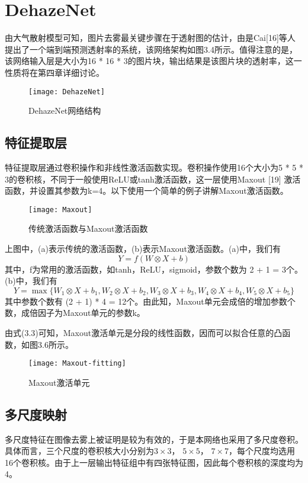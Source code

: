 \documentclass[a4paper, 12pt]{report}
\begin{document}
\section{DehazeNet\quad}
由大气散射模型可知，图片去雾最关键步骤在于透射图的估计，由是Cai[16]等人提出了一个端到端预测透射率的系统，该网络架构如图3.4所示。值得注意的是，该网络输入层是大小为16 * 16 * 3的图片块，输出结果是该图片块的透射率，这一性质将在第四章详细讨论。
\begin{figure}[h]
\centering
\texttt{[image: DehazeNet]}
\caption{DehazeNet网络结构}
\end{figure}

\subsection{特征提取层\quad}
特征提取层通过卷积操作和非线性激活函数实现。卷积操作使用16个大小为5 * 5 * 3的卷积核，不同于一般使用ReLU或tanh激活函数，这一层使用Maxout [19] 激活函数，并设置其参数为k=4。以下使用一个简单的例子讲解Maxout激活函数。
\begin{figure}[H]
\centering
\texttt{[image: Maxout]}
\caption{传统激活函数与Maxout激活函数}
\end{figure}
上图中，(a)表示传统的激活函数，(b)表示Maxout激活函数。(a)中，我们有$$Y = f(W \otimes X + b)$$
其中，f为常用的激活函数，如tanh，ReLU，sigmoid，参数个数为 2 + 1 = 3个。(b)中，我们有
\begin{equation}
Y = \max\{W_1 \otimes X + b_1, W_2 \otimes X + b_2, W_3 \otimes X + b_3, W_4 \otimes X + b_4, W_5 \otimes X + b_5\}
\end{equation}
其中参数个数有 (2 + 1) * 4 = 12个。由此知，Maxout单元会成倍的增加参数个数，成倍因子为Maxout单元的参数k。

由式(3.3)可知，Maxout激活单元是分段的线性函数，因而可以拟合任意的凸函数，如图3.6所示。
\begin{figure}[H]
\centering
\texttt{[image: Maxout-fitting]}
\caption{Maxout激活单元}
\end{figure}

\subsection{多尺度映射\quad}
多尺度特征在图像去雾上被证明是较为有效的，于是本网络也采用了多尺度卷积。具体而言，三个尺度的卷积核大小分别为$3\times 3$， $5\times 5$， $7\times 7$，每个尺度均选用16个卷积核。由于上一层输出特征组中有四张特征图，因此每个卷积核的深度均为4。
\end{document}
